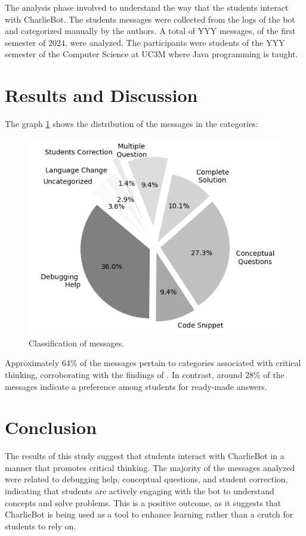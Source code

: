 \documentclass[conference]{IEEEtran}
\begin{document}
The analysis phase involved to understand the way that the students interact
with CharlieBot. The students messages were collected from the logs of the bot
and categorized manually by the authors. A total of YYY messages, of the first
semester of 2024, were analyzed. The participants were students of the YYY
semester of the Computer Science at UC3M where Java programming is taught.

\section{Results and Discussion}

The graph \ref{fig:graph1} shows the distribution of the messages in the
categories:
\begin{figure}[h!]
    \centering
    \includegraphics[scale=0.7]{figures/figure1.png}
    \caption{Classification of messages.}
    \label{fig:graph1}
\end{figure}

Approximately 64\% of the messages pertain to categories associated with
critical thinking, corroborating with the findings of
\cite{Ghimire24}. In contrast, around 28\% of the messages
indicate a preference among students for ready-made answers.

\section{Conclusion}

The results of this study suggest that students interact with CharlieBot in a
manner that promotes critical thinking. The majority of the messages analyzed
were related to debugging help, conceptual questions, and student correction,
indicating that students are actively engaging with the bot to understand
concepts and solve problems. This is a positive outcome, as it suggests that
CharlieBot is being used as a tool to enhance learning rather than a crutch for
students to rely on.



\end{document}
